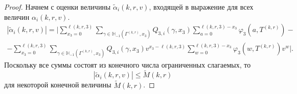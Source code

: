 \documentclass[a4paper,12pt,russian]{extarticle}
\begin{document}
\begin{proof}
Начнем с оценки величины $\tilde{\alpha}_i(k,r,v)$, входящей в выражение для всех величин $\alpha_i(k,r,v)$. 
\begin{multline*}
|\tilde{\alpha}_i(k,r,v) |= | \sum_{x_3=0}^{\ell(k,r,3)}\sum_{\gamma \in {\mathbb H}_{-1}(\Gamma^{(k,r)},x_3)} Q_{3,i}(\gamma,x_3) \sum_{a=0}^{\ell(k,r,3) - x_3} \varphi_3(a,T^{(k,r)}) - \\
- \sum_{x_3=0}^{\ell(k,r,3)}  \sum_{\gamma \in {\mathbb H}_{-1}(\Gamma^{(k,r)},x_3)} Q_{3,i}(\gamma,x_3) v^{x_3-\ell(k,r,3)}  \sum_{w=0}^{\ell(k,r,3) -x_3}
\varphi_3(w,T^{(k,r)}) v^w|.
\end{multline*}
Поскольку все суммы состоят из конечного числа ограниченных слагаемых, то
\begin{equation*}
|\tilde{\alpha}_i(k,r,v) | \leqslant \tilde{M}(k,r)
\end{equation*}
для некоторой конечной величины $\tilde{M}(k,r)$.


\end{proof}
\end{document}
